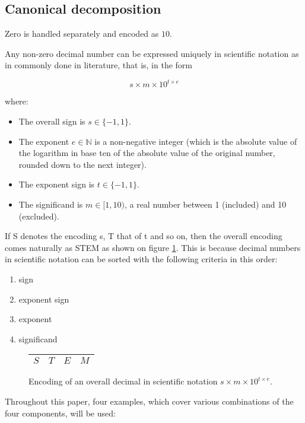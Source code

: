 \documentclass{acm_proc_article-sp}
\begin{document}
\subsection{Canonical decomposition}

Zero is handled separately and encoded as $10$.

Any non-zero decimal number can be expressed uniquely in scientific notation as in commonly done in literature, that is, in the form

$$s\times m \times10^{t\times e}$$

where:

\begin{itemize}
\item The overall sign is $s\in \{-1, 1\}$.
\item The exponent $e\in \mathbb{N}$ is a non-negative integer (which is the absolute value of the logarithm in base ten of the absolute value of the original number, rounded down to the next integer).
\item The exponent sign is $t\in \{-1, 1\}$.
\item The significand is $m\in [1,10)$, a real number between 1 (included) and 10 (excluded).
\end{itemize}

If S denotes the encoding s, T that of t and so on, then the overall encoding comes naturally as STEM as shown on figure \ref{figure-overall-encoding}. This is because decimal numbers in scientific notation can be sorted with the following criteria in this order:
\begin{enumerate}
\item sign
\item exponent sign
\item exponent
\item significand
\end{enumerate}

\begin{figure}
\caption{Encoding of an overall decimal in scientific notation $s\times m \times10^{t\times e}$.}
\label{figure-overall-encoding}
\center
\begin{tabular}{|l|l|l|l|}
\hline
$S$ & $T$ & $E$ & $M$ \\
\hline
\end{tabular}
\end{figure}

Throughout this paper, four examples, which cover various combinations of the four components, will be used:
\end{document}
